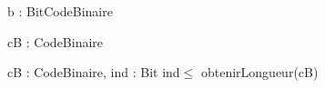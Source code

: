 \begin{algorithme}

    {b : Bit}{CodeBinaire}{}

    {
    }

    {cB : CodeBinaire}{\naturelNonNul}{}

    {cB : CodeBinaire, ind : \naturelNonNul}{Bit}
    {ind$\le$ obtenirLongueur(cB)}

\end{algorithme}
